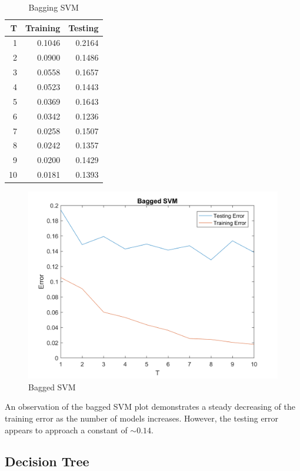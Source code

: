 \documentclass[12pt, letterpaper]{report}
\begin{document}
\begin{table}[H]
	\centering
	\begin{tabular}{ |r|r|r| }
		\hline
		\textbf{T} & \textbf{Training} & \textbf{Testing} \\
		\hline
		1 & 0.1046 & 0.2164 \\
		\hline
		2 & 0.0900 & 0.1486 \\
		\hline
		3 & 0.0558 & 0.1657 \\
		\hline
		4 & 0.0523 & 0.1443 \\
		\hline
		5 & 0.0369 & 0.1643 \\
		\hline
		6 & 0.0342 & 0.1236 \\
		\hline
		7 & 0.0258 & 0.1507 \\
		\hline
		8 & 0.0242 & 0.1357 \\
		\hline
		9 & 0.0200 & 0.1429 \\
		\hline
		10 & 0.0181 & 0.1393 \\
		\hline
	\end{tabular}
	\caption{Bagging SVM}
\end{table}


\begin{figure}[H]
	\centering
	\includegraphics[width=0.7\columnwidth]{bag_svm.png}
	\caption{Bagged SVM}
\end{figure}


An observation of the bagged SVM plot demonstrates a steady decreasing of the training error as the number of models increases. However, the testing error appears to approach a constant of $\sim 0.14$.


\subsection{Decision Tree}
\end{document}

